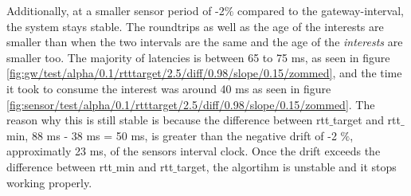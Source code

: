 Additionally, at a smaller sensor period of -2$\%$ compared to the gateway-interval, the system stays stable. The roundtrips as well as the age of the interests are smaller than when the two intervals are the same and the age of the \textit{interests} are smaller too. The majority of latencies is between 65 to 75 ms, as seen in figure \ref{fig:gw/test/alpha/0.1/rtttarget/2.5/diff/0.98/slope/0.15/zommed}, and the time it took to consume the interest was around 40 ms as seen in figure \ref{fig:sensor/test/alpha/0.1/rtttarget/2.5/diff/0.98/slope/0.15/zommed}. The reason why this is still stable is because the difference between rtt$\_$target and rtt$\_$min, 88 ms - 38 ms = 50 ms, is greater than the negative drift of -2 $\%$, approximatly 23 ms, of the sensors interval clock. Once the drift exceeds the difference between rtt$\_$min and rtt$\_$target, the algortihm is unstable and it stops working properly.







